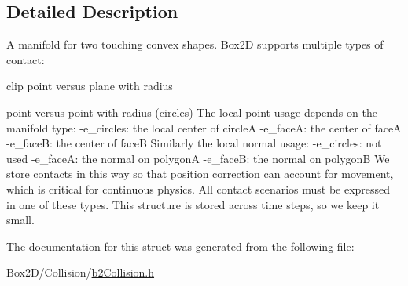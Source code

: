 \subsection{Detailed Description}
A manifold for two touching convex shapes. Box2D supports multiple types of contact\+:
\begin{DoxyItemize}
\item clip point versus plane with radius
\item point versus point with radius (circles) The local point usage depends on the manifold type\+: -\/e\+\_\+circles\+: the local center of circleA -\/e\+\_\+faceA\+: the center of faceA -\/e\+\_\+faceB\+: the center of faceB Similarly the local normal usage\+: -\/e\+\_\+circles\+: not used -\/e\+\_\+faceA\+: the normal on polygonA -\/e\+\_\+faceB\+: the normal on polygonB We store contacts in this way so that position correction can account for movement, which is critical for continuous physics. All contact scenarios must be expressed in one of these types. This structure is stored across time steps, so we keep it small. 
\end{DoxyItemize}

The documentation for this struct was generated from the following file\+:\begin{DoxyCompactItemize}
\item 
Box2\+D/\+Collision/\hyperlink{b2_collision_8h}{b2\+Collision.\+h}\end{DoxyCompactItemize}
